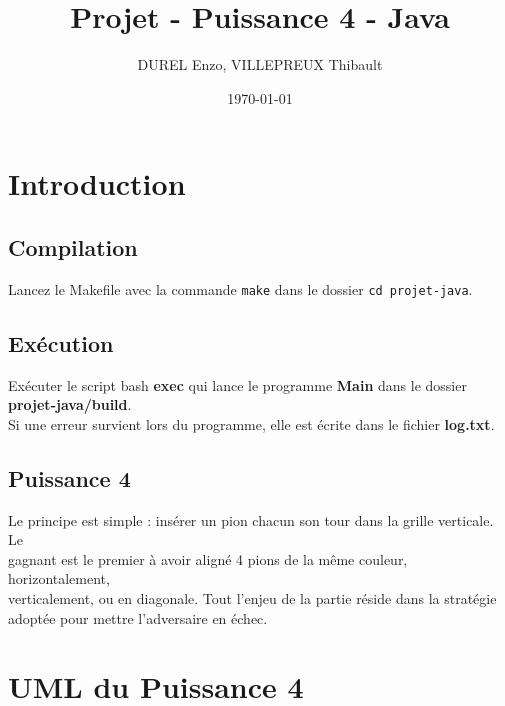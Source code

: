 \documentclass[11pt]{article}
\author{DUREL Enzo, VILLEPREUX Thibault}
\date{\today}
\title{Projet - Puissance 4 - Java}
\begin{document}
\maketitle
\tableofcontents

\thispagestyle{fancy}

\newpage

\section{Introduction}
\label{sec:org36673c7}

\subsection{Compilation}
\label{sec:org4ddd2cb}

Lancez le Makefile avec la commande \texttt{make} dans le dossier \texttt{cd projet-java}.\\

\subsection{Exécution}
\label{sec:org3581cc0}

Exécuter le script bash \textbf{exec} qui lance le programme \textbf{Main} dans le dossier\\
\textbf{projet-java/build}.\\

Si une erreur survient lors du programme, elle est écrite dans le fichier \textbf{log.txt}.\\

\subsection{Puissance 4}
\label{sec:org32fbbba}

Le principe est simple : insérer un pion chacun son tour dans la grille verticale. Le\\
gagnant est le premier à avoir aligné 4 pions de la même couleur, horizontalement,\\
verticalement, ou en diagonale. Tout l'enjeu de la partie réside dans la stratégie\\
adoptée pour mettre l'adversaire en échec.\\


\newpage

\section{UML du Puissance 4}
\label{sec:orgfa227dd}
\end{document}
